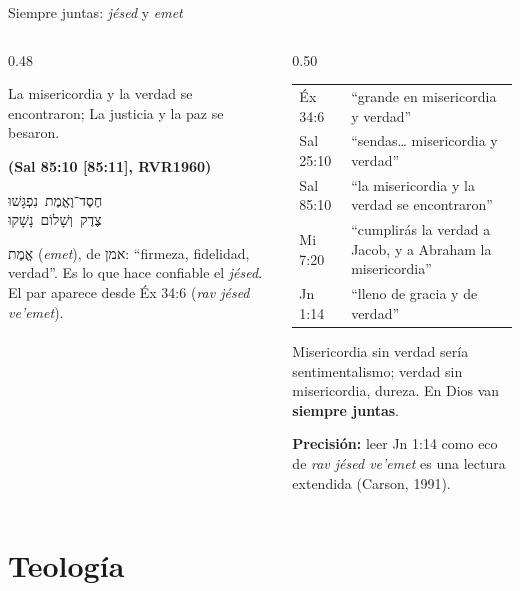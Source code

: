 \documentclass[hyperref={bookmarks=false},aspectratio=169]{beamer}
\newcommand{\heb}[1]{\mbox{\foreignlanguage{hebrew}{#1}}}
\newcommand{\fuente}[1]{\par\hfill{\upshape\bfseries\footnotesize\textcolor{azul}{#1}}}
\newcommand{\destacar}[1]{\textbf{\textcolor{azul}{#1}}}
\newcommand{\precision}[1]{{\footnotesize\color{gris}\textbf{Precisión:} #1}}
\begin{document}
\begin{frame}{Siempre juntas: \emph{jésed} y \emph{emet}}
\begin{columns}[c,onlytextwidth]
\begin{column}{0.48\textwidth}
\begin{cita}La misericordia y la verdad se encontraron; La justicia y la paz se besaron.\fuente{(Sal 85:10 [85:11], RVR1960)}\end{cita}
\begin{center}\heb{חֶסֶד־וֶאֱמֶת נִפְגָּשׁוּ}\\ \heb{צֶדֶק וְשָׁלוֹם נָשָׁקוּ}\end{center}
\scriptsize\heb{אֱמֶת} (\emph{emet}), de \heb{אמן}: ``firmeza, fidelidad, verdad''. Es lo que hace confiable el \emph{jésed}. El par aparece desde Éx 34:6 (\emph{rav jésed ve'emet}).
\end{column}
\begin{column}{0.50\textwidth}
\scriptsize\renewcommand{\arraystretch}{1.15}
\begin{tabular}{@{}>{\RaggedRight\arraybackslash}p{1.5cm}>{\RaggedRight\arraybackslash}p{4.3cm}@{}}
\toprule
Éx 34:6 & ``grande en misericordia y verdad'' \\
Sal 25:10 & ``sendas\ldots{} misericordia y verdad'' \\
Sal 85:10 & ``la misericordia y la verdad se encontraron'' \\
Mi 7:20 & ``cumplirás la verdad a Jacob, y a Abraham la misericordia'' \\
Jn 1:14 & ``lleno de gracia y de verdad'' \\
\bottomrule
\end{tabular}\par\medskip
\small Misericordia sin verdad sería sentimentalismo; verdad sin misericordia, dureza. En Dios van \destacar{siempre juntas}.\par\smallskip
\precision{leer Jn 1:14 como eco de \emph{rav jésed ve'emet} es una lectura extendida (Carson, 1991).}
\end{column}
\end{columns}
\end{frame}

\section{Teología}
\end{document}
